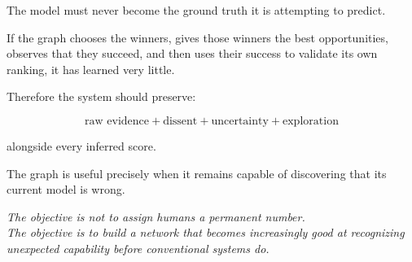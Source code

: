 \documentclass[11pt]{article}
\begin{document}
The model must never become the ground truth it is attempting to predict.

If the graph chooses the winners, gives those winners the best opportunities,
observes that they succeed, and then uses their success to validate its own
ranking, it has learned very little.

Therefore the system should preserve:

\[
\boxed{
\text{raw evidence}
+
\text{dissent}
+
\text{uncertainty}
+
\text{exploration}
}
\]

alongside every inferred score.

The graph is useful precisely when it remains capable of discovering that its
current model is wrong.

\vfill

\begin{center}
\textit{
The objective is not to assign humans a permanent number.\\
The objective is to build a network that becomes increasingly good at
recognizing unexpected capability before conventional systems do.
}
\end{center}
\end{document}
